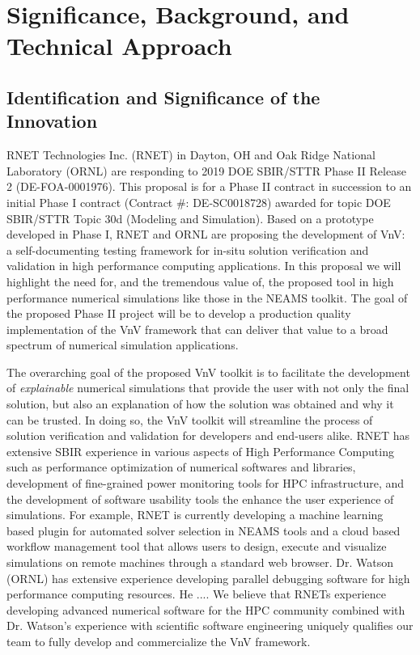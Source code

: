 


\section{Significance, Background, and Technical Approach}

\subsection{Identification and Significance of the Innovation}
\label{sec:identification}

RNET Technologies Inc. (RNET) in Dayton, OH and Oak Ridge National Laboratory 
(ORNL) are responding to 2019 DOE SBIR/STTR Phase II Release 2 
(DE-FOA-0001976). This proposal is for a Phase II contract in succession to an 
initial Phase I contract (Contract \#: DE-SC0018728) awarded for topic DOE 
SBIR/STTR Topic 30d (Modeling and Simulation). Based on a prototype developed in Phase I, RNET and ORNL are proposing the development of VnV: a self-documenting 
testing framework for in-situ solution verification and validation in high performance computing applications. In this proposal we will highlight the need for, and the tremendous value of, 
the proposed tool in high performance numerical simulations like those in the NEAMS toolkit. The goal of the proposed Phase II project will be to develop a production quality implementation of the VnV framework that can deliver that value to a broad spectrum of numerical simulation applications. 

The overarching goal of the proposed VnV toolkit is to facilitate the development of \emph{explainable} numerical simulations that provide 
the user with not only the final solution, but also an explanation of how the solution was obtained and why it can be trusted. In doing so, the VnV toolkit will streamline the process of solution verification and validation for developers and end-users alike. RNET has extensive SBIR experience in various aspects of High Performance Computing such as performance optimization of numerical softwares and libraries, development of fine-grained power monitoring tools for HPC infrastructure, and the development of software usability tools the enhance the user experience of simulations. For example, RNET is currently developing a machine learning based plugin for automated solver selection in NEAMS tools and a cloud based workflow management tool that allows users to design, execute and visualize simulations on remote machines through a standard web browser. Dr. Watson (ORNL) has extensive experience developing parallel debugging software for high performance computing resources. He .... We believe that RNETs experience developing advanced numerical software for the HPC community combined with Dr. Watson's experience with scientific software engineering uniquely qualifies our team to fully develop and commercialize the VnV framework.

